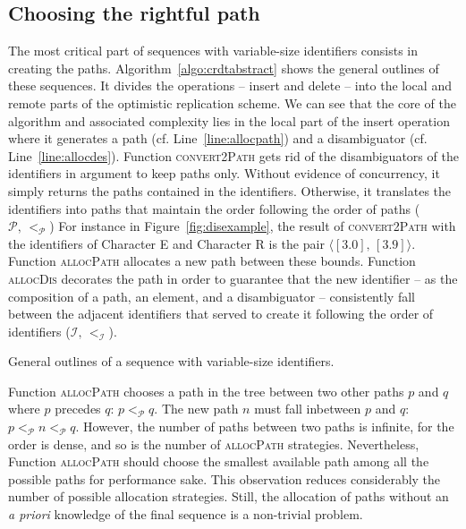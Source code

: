 \subsection{Choosing the rightful path}
\label{subsec:choosing}

The most critical part of sequences with variable-size identifiers consists in
creating the paths. Algorithm~\ref{algo:crdtabstract} shows the general outlines
of these sequences. It divides the operations -- insert and delete -- into the
local and remote parts of the optimistic replication scheme. We can see that the
core of the algorithm and associated complexity lies in the local part of the
insert operation where it generates a path (cf. Line~\ref{line:allocpath}) and a
disambiguator (cf. Line~\ref{line:allocdes}). Function \textsc{convert2Path}
gets rid of the disambiguators of the identifiers in argument to keep paths
only. Without evidence of concurrency, it simply returns the paths contained in
the identifiers. Otherwise, it translates the identifiers into paths that
maintain the order following the order of paths
($\mathcal{P},\, <_{\mathcal{P}}$) For instance in Figure~\ref{fig:disexample},
the result of \textsc{convert2Path} with the identifiers of Character E and
Character R is the pair $\langle [3.0],\, [3.9]\rangle$. Function
\textsc{allocPath} allocates a new path between these bounds. Function
\textsc{allocDis} decorates the path in order to guarantee that the new
identifier -- as the composition of a path, an element, and a disambiguator --
consistently fall between the adjacent identifiers that served to create it
following the order of identifiers ($\mathcal{I}, \, <_\mathcal{I}$).

\begin{algorithm}[h]
  
  \caption{\label{algo:crdtabstract}General outlines of a sequence with
    variable-size identifiers.}
\end{algorithm}

Function \textsc{allocPath} chooses a path in the tree between two other paths
$p$ and $q$ where $p$ precedes $q$: $p<_{\mathcal{P}}q$. The new path $n$ must
fall inbetween $p$ and $q$: $p<_\mathcal{P}n<_\mathcal{P}q$. However, the number
of paths between two paths is infinite, for the order is dense, and so is the
number of \textsc{allocPath} strategies. Nevertheless, Function
\textsc{allocPath} should choose the smallest available path among all the
possible paths for performance sake. This observation reduces considerably the
number of possible allocation strategies. Still, the allocation of paths without
an \emph{a priori} knowledge of the final sequence is a non-trivial problem.

